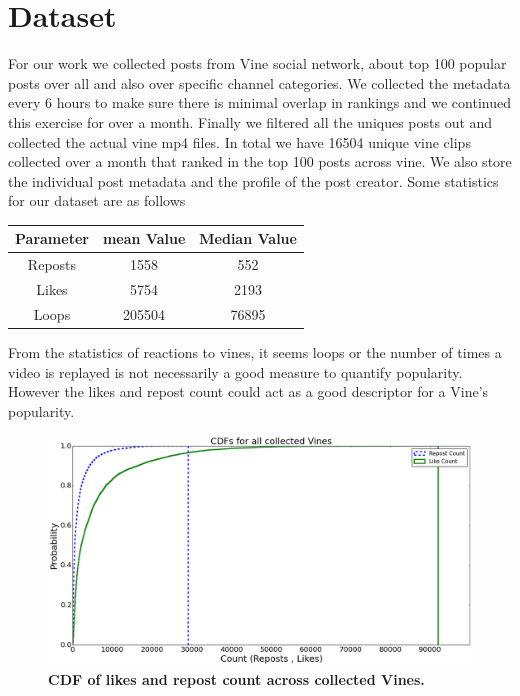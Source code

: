 \section{Dataset}
For our work we collected posts from Vine social network, about top 100 popular posts over all and also over specific channel categories. We collected the metadata every 6 hours to make sure there is minimal overlap in rankings and we continued this exercise for over a month. Finally we filtered all the uniques posts out and collected the actual vine mp4 files. In total we have 16504 unique vine clips collected over a month that ranked in the top 100 posts across vine. We also store the individual post metadata and the profile of the post creator. Some statistics for our dataset are as follows 
\par
\begin{center}
\begin{tabular}{ |c|c|c| } 
 \hline
 Parameter & mean Value & Median Value \\ 
 \hline
 Reposts & 1558 & 552 \\ 
 Likes & 5754 & 2193 \\ 
 Loops & 205504 & 76895 \\ 
 \hline
\end{tabular}
\end{center}
\par
From the statistics of reactions to vines, it seems loops or the number of times a video is replayed is not necessarily a good measure to quantify popularity. However the likes and repost count could act as a good descriptor for a Vine's popularity. 

\begin{figure}
\centering
\includegraphics[width=\columnwidth]{plots/Like_repost_CDF}
\caption{\textbf{CDF of likes and repost count across collected Vines.}}
\label{fig:Like_Repost_CDF}
\end{figure}

